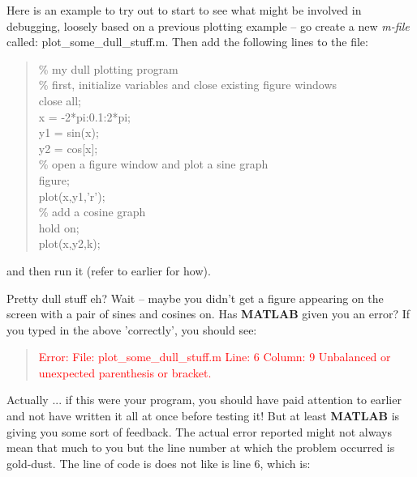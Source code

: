 \documentclass{tufte-book} %
\newenvironment{docspec}{\begin{quotation}\ttfamily\parskip0pt\parindent0pt\ignorespaces}{\end{quotation}}
\begin{document}
Here is an example to try out to start to see what might be involved in debugging,  loosely based on a previous plotting example -- go create a new \textit{m-file} called: \textsf{plot\_some\_dull\_stuff.m}. Then add the following lines to the file:

\begin{docspec}
\textcolor[rgb]{0,0.501961,0}{\% my dull plotting program
\\\% first, initialize variables and close existing figure windows}
\\close \textcolor[rgb]{0.501961,0,1}{all};
\\x = -2*pi:0.1:2*pi;
\\y1 = sin(x); 
\\y2 = cos[x];
\textcolor[rgb]{0,0.501961,0}{\\\% open a figure window and plot a sine graph}
\\figure;
\\plot(x,y1,\textcolor[rgb]{0.501961,0,1}{'r'});
\textcolor[rgb]{0,0.501961,0}{\\\% add a cosine graph} 
\\hold \textcolor[rgb]{0.501961,0,1}{on};
\\plot(x,y2,k);
\end{docspec} 

\noindent and then run it (refer to earlier for how).

Pretty dull stuff eh? Wait -- maybe you didn't get a figure appearing on the screen with a pair of sines and cosines on. Has \textbf{MATLAB} given you an error? If you typed in the above 'correctly', you should see:
\begin{docspec}
\textcolor{red}{Error: File: plot\_some\_dull\_stuff.m Line: 6 Column: 9
Unbalanced or unexpected parenthesis or bracket.}
\end{docspec}

\noindent Actually ... if this were your program, you should have paid attention to earlier and not have written it all at once before testing it! But at least \textbf{MATLAB} is giving you some sort of feedback. The actual error reported might not always mean that much to you but the line number at which the problem occurred is gold-dust. The line of code is does not like is line 6, which is:
\end{document}
